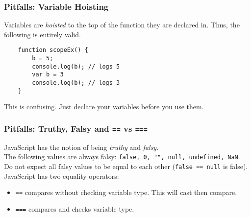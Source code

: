 \documentclass{lug}
\begin{document}
\begin{frame}[fragile]
    \frametitle{Pitfalls: Variable Hoisting}

    Variables are \textit{hoisted} to the top of the function they are declared in. Thus, the
    following is entirely valid.

    \begin{verbatim}
    function scopeEx() {
        b = 5;
        console.log(b); // logs 5
        var b = 3
        console.log(b); // logs 3
    }
    \end{verbatim}

    This is confusing. Just declare your variables before you use them.

\end{frame}

\begin{frame}
    \frametitle{Pitfalls: Truthy, Falsy and \texttt{==} vs \texttt{===}}

    JavaScript has the notion of being \textit{truthy} and \textit{falsy}.\\

    The following values are always falsy: \texttt{false, 0, "", null, undefined, NaN}. \\

    Do not expect all falsy values to be equal to each other (\texttt{false == null} is false). \\

    JavaScript has two equality operators:
    \begin{itemize}
        \item \texttt{==} compares without checking variable type. This will cast then compare.
        \item \texttt{===} compares and checks variable type.
    \end{itemize}
\end{frame}
\end{document}
